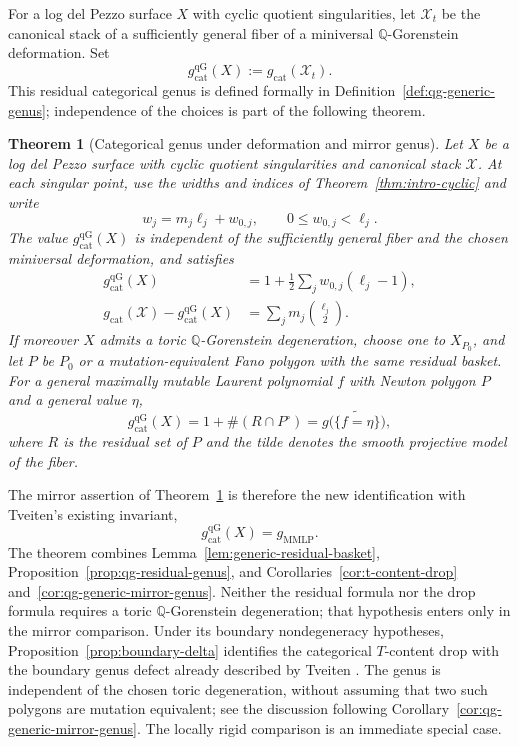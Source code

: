 \documentclass[11pt]{article}
\theoremstyle{plain}
\newtheorem{theorem}{Theorem}[section]
\theoremstyle{definition}
\theoremstyle{remark}
\newcommand{\cX}{\mathcal X}
\newcommand{\Q}{\mathbb Q}
\newcommand{\1}{\mathbf 1}
\begin{document}
For a log del Pezzo surface $X$ with cyclic quotient singularities, let $\mathcal X_t$ be the canonical stack of a sufficiently general fiber of a miniversal $\Q$-Gorenstein deformation.  Set
\[
g_{\mathrm{cat}}^{\mathrm{qG}}(X):=g_{\mathrm{cat}}(\mathcal X_t).
\]
This residual categorical genus is defined formally in Definition~\ref{def:qg-generic-genus}; independence of the choices is part of the following theorem.

\begin{theorem}[Categorical genus under deformation and mirror genus]\label{thm:intro-mirror}
Let $X$ be a log del Pezzo surface with cyclic quotient singularities and canonical stack $\cX$.  At each singular point, use the widths and indices of Theorem~\ref{thm:intro-cyclic} and write
\[
w_j=m_j\ell_j+w_{0,j},\qquad 0\le w_{0,j}<\ell_j.
\]
The value $g_{\mathrm{cat}}^{\mathrm{qG}}(X)$ is independent of the sufficiently general fiber and the chosen miniversal deformation, and satisfies
\[
\begin{aligned}
g_{\mathrm{cat}}^{\mathrm{qG}}(X)
&=1+\frac12\sum_j w_{0,j}(\ell_j-1),\\
g_{\mathrm{cat}}(\cX)-g_{\mathrm{cat}}^{\mathrm{qG}}(X)
&=\sum_j m_j\binom{\ell_j}{2}.
\end{aligned}
\]
If moreover $X$ admits a toric $\Q$-Gorenstein degeneration, choose one to $X_{P_0}$, and let $P$ be $P_0$ or a mutation-equivalent Fano polygon with the same residual basket.  For a general maximally mutable Laurent polynomial $f$ with Newton polygon $P$ and a general value $\eta$,
\[
g_{\mathrm{cat}}^{\mathrm{qG}}(X)
=1+\#(R\cap P^\circ)
=g\bigl(\widetilde{\{f=\eta\}}\bigr),
\]
where $R$ is the residual set of $P$ and the tilde denotes the smooth projective model of the fiber.
\end{theorem}

The mirror assertion of Theorem~\ref{thm:intro-mirror} is therefore the new identification with Tveiten's existing invariant,
\[
\boxed{g_{\mathrm{cat}}^{\mathrm{qG}}(X)=g_{\mathrm{MMLP}}.}
\]
The theorem combines Lemma~\ref{lem:generic-residual-basket}, Proposition~\ref{prop:qg-residual-genus}, and Corollaries~\ref{cor:t-content-drop} and~\ref{cor:qg-generic-mirror-genus}.  Neither the residual formula nor the drop formula requires a toric $\Q$-Gorenstein degeneration; that hypothesis enters only in the mirror comparison.  Under its boundary nondegeneracy hypotheses, Proposition~\ref{prop:boundary-delta} identifies the categorical $T$-content drop with the boundary genus defect already described by Tveiten \cite[Remark 3.14, arXiv version 2]{Tveiten}.  The genus is independent of the chosen toric degeneration, without assuming that two such polygons are mutation equivalent; see the discussion following Corollary~\ref{cor:qg-generic-mirror-genus}.  The locally rigid comparison is an immediate special case.
\end{document}
